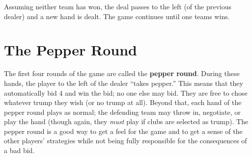 \documentclass[11pt]{article}
\begin{document}
Assuming neither team has won, the deal passes to the left (of the
previous dealer) and a new hand is dealt. The game continues until one
teams wins.

\section{The Pepper Round}\label{the-pepper-round}

The first four rounds of the game are called the \textbf{pepper round}.
During these hands, the player to the left of the dealer ``takes
pepper.'' This means that they automatically bid 4 and win the bid; no
one else may bid. They are free to chose whatever trump they wish (or no
trump at all). Beyond that, each hand of the pepper round plays as
normal; the defending team may throw in, negotiate, or play the hand
(though again, they \emph{must} play if clubs are selected as trump).
The pepper round is a good way to get a feel for the game and to get a
sense of the other players' strategies while not being fully responsible
for the consequences of a bad bid.
\end{document}
